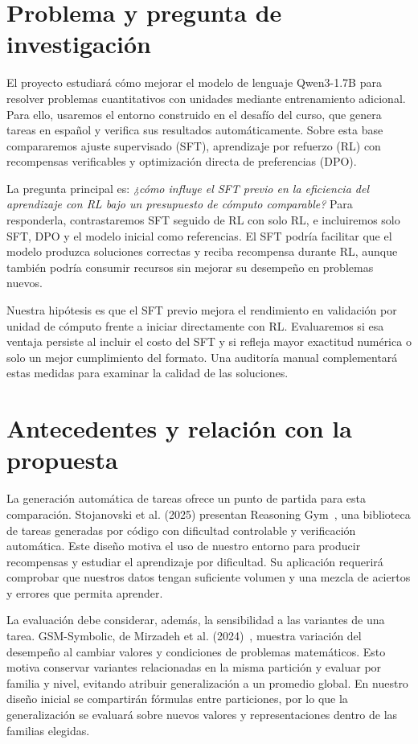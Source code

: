 \section{Problema y pregunta de investigación}
El proyecto estudiará cómo mejorar el modelo de lenguaje Qwen3-1.7B para resolver
problemas cuantitativos con unidades mediante entrenamiento adicional. Para ello,
usaremos el entorno construido en el desafío del curso, que genera tareas en
español y verifica sus resultados automáticamente. Sobre esta base compararemos
ajuste supervisado (SFT), aprendizaje por refuerzo (RL) con recompensas
verificables y optimización directa de preferencias (DPO).

La pregunta principal es: \emph{¿cómo influye el SFT previo en la eficiencia del
aprendizaje con RL bajo un presupuesto de cómputo comparable?} Para responderla,
contrastaremos SFT seguido de RL con solo RL, e incluiremos solo SFT, DPO y el
modelo inicial como referencias. El SFT podría facilitar que el modelo produzca
soluciones correctas y reciba recompensa durante RL, aunque también podría
consumir recursos sin mejorar su desempeño en problemas nuevos.

Nuestra hipótesis es que el SFT previo mejora el rendimiento en validación por
unidad de cómputo frente a iniciar directamente con RL. Evaluaremos si esa
ventaja persiste al incluir el costo del SFT y si refleja mayor exactitud numérica
o solo un mejor cumplimiento del formato. Una auditoría manual complementará
estas medidas para examinar la calidad de las soluciones.

\section{Antecedentes y relación con la propuesta}
La generación automática de tareas ofrece un punto de partida para esta
comparación. Stojanovski et al. (2025) presentan Reasoning Gym~\cite{reasoninggym}, una
biblioteca de tareas generadas por código con dificultad controlable y
verificación automática. Este diseño motiva el uso de nuestro entorno para
producir recompensas y estudiar el aprendizaje por dificultad. Su aplicación
requerirá comprobar que nuestros datos tengan suficiente volumen y una mezcla
de aciertos y errores que permita aprender.

La evaluación debe considerar, además, la sensibilidad a las variantes de una
tarea. GSM-Symbolic, de Mirzadeh et al. (2024)~\cite{gsmsymbolic}, muestra variación
del desempeño al cambiar valores y condiciones de problemas matemáticos.
Esto motiva conservar variantes relacionadas en la misma partición y evaluar
por familia y nivel, evitando atribuir generalización a un promedio global.
En nuestro diseño inicial se compartirán fórmulas entre particiones, por lo que
la generalización se evaluará sobre nuevos valores y representaciones dentro
de las familias elegidas.

